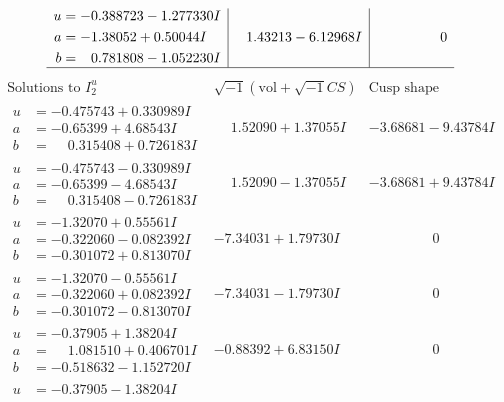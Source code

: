 \documentclass[1p]{elsarticle_modified}
\theoremstyle{definition}
\newcommand{\I}{\sqrt{-1}}
\begin{document}
$$\begin{array}{c|c|c}
\begin{aligned}
u &= -0.388723 - 1.277330 I \\
a &= -1.38052 + 0.50044 I \\
b &= \phantom{-}0.781808 - 1.052230 I\end{aligned}
 & \phantom{-}1.43213 - 6.12968 I & \phantom{-0.000000 } 0\\
 \hline 
 \end{array}$$\newpage$$\begin{array}{c|c|c}  
\text{Solutions to }I^u_{2}& \I (\text{vol} + \sqrt{-1}CS) & \text{Cusp shape}\\
 \hline 
\begin{aligned}
u &= -0.475743 + 0.330989 I \\
a &= -0.65399 + 4.68543 I \\
b &= \phantom{-}0.315408 + 0.726183 I\end{aligned}
 & \phantom{-}1.52090 + 1.37055 I & -3.68681 - 9.43784 I \\ \hline\begin{aligned}
u &= -0.475743 - 0.330989 I \\
a &= -0.65399 - 4.68543 I \\
b &= \phantom{-}0.315408 - 0.726183 I\end{aligned}
 & \phantom{-}1.52090 - 1.37055 I & -3.68681 + 9.43784 I \\ \hline\begin{aligned}
u &= -1.32070 + 0.55561 I \\
a &= -0.322060 - 0.082392 I \\
b &= -0.301072 + 0.813070 I\end{aligned}
 & -7.34031 + 1.79730 I & \phantom{-0.000000 } 0 \\ \hline\begin{aligned}
u &= -1.32070 - 0.55561 I \\
a &= -0.322060 + 0.082392 I \\
b &= -0.301072 - 0.813070 I\end{aligned}
 & -7.34031 - 1.79730 I & \phantom{-0.000000 } 0 \\ \hline\begin{aligned}
u &= -0.37905 + 1.38204 I \\
a &= \phantom{-}1.081510 + 0.406701 I \\
b &= -0.518632 - 1.152720 I\end{aligned}
 & -0.88392 + 6.83150 I & \phantom{-0.000000 } 0 \\ \hline\begin{aligned}
u &= -0.37905 - 1.38204 I \\

\end{aligned}
\end{array}$$
\end{document}
